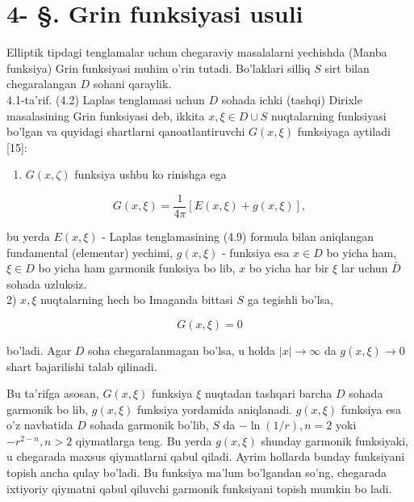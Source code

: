 \documentclass[10pt]{article}
\begin{document}
\captionsetup{singlelinecheck=false}
\section*{4- §. Grin funksiyasi usuli}
Elliptik tipdagi tenglamalar uchun chegaraviy masalalarni yechishda (Manba funksiya) Grin funksiyasi muhim o'rin tutadi. Bo'laklari silliq $S$ sirt bilan chegaralangan $D$ sohani qaraylik.\\
4.1-ta'rif. (4.2) Laplas tenglamasi uchun $D$ sohada ichki (tashqi) Dirixle masalasining Grin funksiyasi deb, ikkita $x, \xi \in D \cup S$ nuqtalarning funksiyasi bo'lgan va quyidagi shartlarni qanoatlantiruvchi $G(x, \xi)$ funksiyaga aytiladi [15]:

\begin{enumerate}
  \item $G(x, \zeta)$ funksiya ushbu ko rinishga ega
\end{enumerate}


\begin{equation*}
G(x, \xi)=\frac{1}{4 \pi}[E(x, \xi)+g(x, \xi)], \tag{4.56}
\end{equation*}


bu yerda $E(x, \xi)$ - Laplas tenglamasining (4.9) formula bilan aniqlangan fundamental (elementar) yechimi, $g(x, \xi)$ - funksiya esa $x \in D$ bo yicha ham, $\xi \in D$ bo yicha ham garmonik funksiya bo lib, $x$ bo yicha har bir $\xi$ lar uchun $\bar{D}$ sohada uzluksiz.\\
2) $x, \xi$ nuqtalarning hech bo Imaganda bittasi $S$ ga tegishli bo'lsa,


\begin{equation*}
G(x, \xi)=0 \tag{4.57}
\end{equation*}


bo'ladi. Agar $D$ soha chegaralanmagan bo'lsa, u holda $|x| \rightarrow \infty$ da $g(x, \xi) \rightarrow 0$ shart bajarilishi talab qilinadi.

Bu ta'rifga asosan, $G(x, \xi)$ funksiya $\xi$ nuqtadan tashqari barcha $D$ sohada garmonik bo lib, $g(x, \xi)$ funksiya yordamida aniqlanadi. $g(x, \xi)$ funksiya esa o'z navbatida $D$ sohada garmonik bo'lib, $S$ da $-\ln (1 / r), n=2$ yoki $-r^{2-n}, n>2$ qiymatlarga teng. Bu yerda $g(x, \xi)$ shunday garmonik funksiyaki, u chegarada maxsus qiymatlarni qabul qiladi. Ayrim hollarda bunday funksiyani topish ancha qulay bo'ladi. Bu funksiya ma'lum bo'lgandan so'ng, chegarada ixtiyoriy qiymatni qabul qiluvchi garmonik funksiyani topish mumkin bo ladi.
\end{document}
